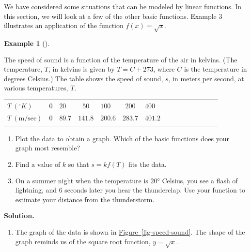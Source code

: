 \documentclass[10pt,]{book}
\theoremstyle{plain}
\theoremstyle{definition}
\theoremstyle{definition}
\newtheorem{example}[theorem]{Example}
\numberwithin{equation}{section}
\newcommand{\hrulethin}  {\noalign{\hrule height 0.04em}}
\newcommand{\hrulethick} {\noalign{\hrule height 0.11em}}
\newcommand\degree[0]{^{\circ}}
\begin{document}
        We have considered some situations that can be modeled by linear functions. In this section, we will look at a few of the other basic functions. Example 3 illustrates an application of the function \(f (x) =\sqrt{x}\).
\begin{example}[]\label{example-sound}

    The speed of sound is a function of the temperature of the air in kelvins. (The temperature, \(T\), in kelvins is given by \(T = C + 273\), where \(C\) is the temperature in degrees Celsius.) The table shows the speed of sound, \(s\), in meters per second, at various temperatures, \(T\).
%
\leavevmode%
\begin{table}
\centering
\begin{tabular}{AcAcAcAcAcAcAcA}\hrulethick
\(T ~ (\degree K)\)&\(0\)&\(20\)&\(50\)&\(100\)&\(200\)&\(400\)\tabularnewline\hrulethin
\(T ~ (\text{m/sec})\)&\(0\)&\(89.7\)&\(141.8\)&\(200.6\)&\(283.7\)&\(401.2\)\tabularnewline\hrulethin
\end{tabular}
\end{table}
\leavevmode%
\begin{enumerate}[label=*\alph**]
\item\hypertarget{li-327}{}
            Plot the data to obtain a graph. Which of the basic functions does your graph most resemble?\item\hypertarget{li-328}{}
            Find a value of \(k\) so that \(s = k f (T )\) fits the data.\item\hypertarget{li-329}{}
            On a summer night when the temperature is 20° Celsius, you see a flash of lightning, and \(6\) seconds later you hear the thunderclap. Use your function to estimate your distance from the thunderstorm.\end{enumerate}
\par\medskip\noindent%
\textbf{Solution.}\quad \leavevmode%
\begin{enumerate}[label=*\alph**]
\item\hypertarget{li-330}{}
            The graph of the data is shown in \hyperref[fig-speed-sound]{Figure~\ref{fig-speed-sound}}. The shape of the graph reminds us of the square root function, \(y = \sqrt{x}\).
            \leavevmode%
\begin{figure}
\centering

\end{figure}
\end{enumerate}
\end{example}
\end{document}
